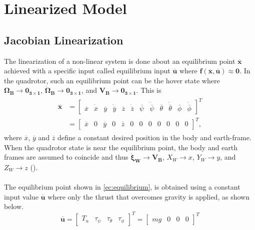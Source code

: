 \section{Linearized Model}
\label{sec:linearized}
\setcounter{MaxMatrixCols}{20}
\subsection{Jacobian Linearization}
The linearization of a non-linear system is done about an equilibrium point $\overline{\mathbf{x}}$ achieved with a specific input called equilibrium input $\overline{\mathbf{u}}$  where $\mathbf{f(\overline{x},\overline{u})} \approx \mathbf{0}$. In the quadrotor, such an equilibrium point can be the hover state where $\mathbf{\Omega_B} \to \mathbf{0_{3\times 1}}$, $\mathbf{\dot{\Omega}_B} \to \mathbf{0_{3\times 1}}$, and $\mathbf{V_{B}} \to \mathbf{0_{3\times 1}}$. This is
\begin{align}
\label{ec:equilibrium}
\begin{split}
\overline{\mathbf{x}} & = \begin{bmatrix}
\overline{x} & \dot{\overline{x}} & \overline{y} & \dot{\overline{y}} & \overline{z} & \dot{\overline{z}} & \overline{\psi} & \dot{\overline{\psi}} & \overline{\theta} & \dot{\overline{\theta}} & \overline{\phi} & \dot{\overline{\phi}}
\end{bmatrix}^{T}\\
 & = \begin{bmatrix}
\overline{x} & 0 & \overline{y} & 0 & \overline{z} & 0 & 0 & 0 & 0 & 0 & 0 & 0
\end{bmatrix}^{T},
\end{split}
\end{align}
where $\overline{x}$, $\overline{y}$ and $\overline{z}$ define a constant desired position in the body and earth-frame. When the quadrotor state is near the equilibrium point, the body and earth frames are assumed to coincide and thus $\mathbf{\dot{\xi}_W}\to \mathbf{V_{B}}$, $X_W \to x$, $Y_W \to y$, and $Z_W \to z$ (\cite{Sabatino2015}).\\\\
The equilibrium point shown in \ref{ec:equilibrium}, is obtained using a constant input value $\overline{\mathbf{u}}$ where only the thrust that overcomes gravity is applied, as shown below.
\begin{equation}
\overline{\mathbf{u}} = \begin{bmatrix}
T_u & \tau_\psi & \tau_\theta & \tau_\phi
\end{bmatrix}^{T} = \begin{bmatrix}
mg & 0 & 0 & 0
\end{bmatrix}^{T}
\end{equation}
